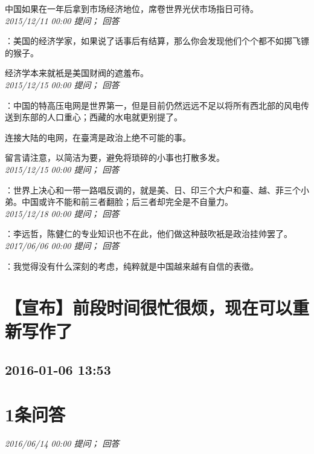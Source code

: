 \documentclass[twocolumn]{ctexart}
\begin{document}
中国如果在一年后拿到市场经济地位，席卷世界光伏市场指日可待。\\

\textit{\hfill\noindent\small 2015/12/11 00:00 提问； 回答}

：美国的经济学家，如果说了话事后有结算，那么你会发现他们个个都不如掷飞镖的猴子。

经济学本来就衹是美国财阀的遮羞布。\\

\textit{\hfill\noindent\small 2015/12/15 00:00 提问； 回答}

：中国的特高压电网是世界第一，但是目前仍然远远不足以将所有西北部的风电传送到东部的人口重心；西藏的水电就更别提了。

连接大陆的电网，在臺湾是政治上绝不可能的事。

留言请注意，以简洁为要，避免将琐碎的小事也打散多发。\\

\textit{\hfill\noindent\small 2015/12/15 00:00 提问； 回答}

：世界上决心和一带一路唱反调的，就是美、日、印三个大户和臺、越、菲三个小弟。中国或许不能和前三者翻脸；后三者却完全是不自量力。\\

\textit{\hfill\noindent\small 2015/12/18 00:00 提问； 回答}

：李远哲，陈健仁的专业知识也不在此，他们做这种鼓吹衹是政治挂帅罢了。\\

\textit{\hfill\noindent\small 2017/06/06 00:00 提问； 回答}

：我觉得没有什么深刻的考虑，纯粹就是中国越来越有自信的表徵。\\


\section{【宣布】前段时间很忙很烦，现在可以重新写作了}
\subsection{2016-01-06 13:53}


\section{1条问答}

\textit{\hfill\noindent\small 2016/06/14 00:00 提问； 回答}
\end{document}
